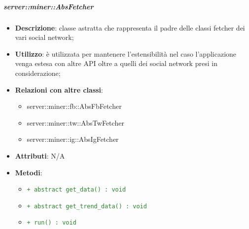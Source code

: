 		\subparagraph{server::miner::AbsFetcher} %
		\label{subp:server_miner_AbsFetcher}
				\begin{itemize}
				\item \textbf{Descrizione}: classe astratta che rappresenta il padre delle classi fetcher dei vari social network;
				\item \textbf{Utilizzo}: è utilizzata per mantenere l'estensibilità nel caso l'applicazione venga estesa con altre API  oltre a quelli dei social network presi in considerazione;
				\item \textbf{Relazioni con altre classi}:
					\begin{itemize}
						\item server::miner::fb::AbsFbFetcher
						\item server::miner::tw::AbsTwFetcher
						\item server::miner::ig::AbsIgFetcher
					\end{itemize}
				\item \textbf{Attributi}: N/A
				\item \textbf{Metodi}:
					\begin{itemize}
						\item \textcolor{forestgreen}{\texttt{+ abstract get\_data() : void}}
						\item \textcolor{forestgreen}{\texttt{+ abstract get\_trend\_data() : void}}
						\item \textcolor{forestgreen}{\texttt{+ run() : void}}
					\end{itemize}
			\end{itemize}

